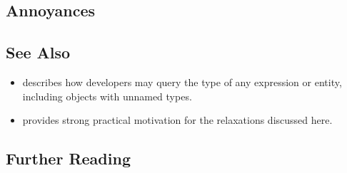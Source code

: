 \subsection[Annoyances]{Annoyances}\label{annoyances}

\hspace{\fill}

\subsection[See Also]{See Also}\label{see-also}

\begin{itemize}
\item{describes how developers may query the type of any expression or entity, including objects with unnamed types.}
\item{provides strong practical motivation for the relaxations discussed here.}
\end{itemize}

\subsection[Further Reading]{Further Reading}\label{further-reading}

\hspace{\fill}



